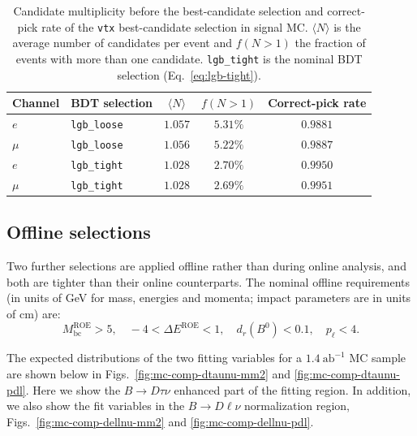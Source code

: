\begin{table}[htbp]
  \centering
  \caption{Candidate multiplicity before the best-candidate selection and
  correct-pick rate of the \texttt{vtx} best-candidate selection in signal
  MC. $\langle N\rangle$ is the average number of candidates per event and
  $f(N>1)$ the fraction of events with more than one candidate.
  \texttt{lgb\_tight} is the nominal BDT selection
  (Eq.~\eqref{eq:lgb-tight}).}
  \label{tab:bcs-performance}
  \small
  \begin{tabular}{l l c c c}
    \hline
    Channel & BDT selection & $\langle N\rangle$ & $f(N>1)$ & Correct-pick rate \\
    \hline
    $e$   & \texttt{lgb\_loose} & $1.057$ & $5.31\%$ & $0.9881$ \\
    $\mu$ & \texttt{lgb\_loose} & $1.056$ & $5.22\%$ & $0.9887$ \\
    $e$   & \texttt{lgb\_tight} & $1.028$ & $2.70\%$ & $0.9950$ \\
    $\mu$ & \texttt{lgb\_tight} & $1.028$ & $2.69\%$ & $0.9951$ \\
    \hline
  \end{tabular}
\end{table}





\subsection{Offline selections}
\label{sec:recon:offline}

Two further selections are applied offline rather than during online
analysis, and both are tighter than their online
counterparts.
The nominal offline requirements (in units of GeV for mass, energies and momenta; impact parameters are in units of cm) are:
\begin{equation}
  M_{\mathrm{bc}}^{\mathrm{ROE}} > 5,\quad
  -4 < \Delta E^{\mathrm{ROE}} < 1,\quad
  d_{r}(B^{0}) < 0.1,\quad
  p_{\ell} < 4  .
  \label{eq:offline-cut}
\end{equation}


The expected distributions of the two fitting variables for a $1.4~\mathrm{ab}^{-1}$ MC sample are shown below in
Figs.~\ref{fig:mc-comp-dtaunu-mm2} and \ref{fig:mc-comp-dtaunu-pdl}. Here we show the $B\to D\tau \nu$ enhanced
part of the fitting region. In addition, we also show the fit variables in the $B\to D \ell\nu$ normalization region,
Figs.~\ref{fig:mc-comp-dellnu-mm2} and \ref{fig:mc-comp-dellnu-pdl}.

